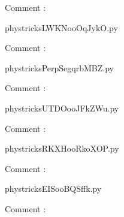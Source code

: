     Comment : 

    \clearpage
    


    \newcommand{\CaptionFigLWKNooOqJykO}{<+Type your caption here+>}
    \begin{center}
        
    \end{center}
    phystricksLWKNooOqJykO.py

    Comment : 

    \clearpage
    


    \newcommand{\CaptionFigPerpSegqrbMBZ}{<+Type your caption here+>}
    \begin{center}
        
    \end{center}
    phystricksPerpSegqrbMBZ.py

    Comment : 

    \clearpage
    


    \newcommand{\CaptionFigUTDOooJFkZWu}{<+Type your caption here+>}
    \begin{center}
        
    \end{center}
    phystricksUTDOooJFkZWu.py

    Comment : 

    \clearpage
    


    \newcommand{\CaptionFigRKXHooRkoXOP}{<+Type your caption here+>}
    \begin{center}
        
    \end{center}
    phystricksRKXHooRkoXOP.py

    Comment : 

    \clearpage
    


    \newcommand{\CaptionFigEISooBQSffk}{<+Type your caption here+>}
    \begin{center}
        
    \end{center}
    phystricksEISooBQSffk.py

    Comment : 

    \clearpage
    

